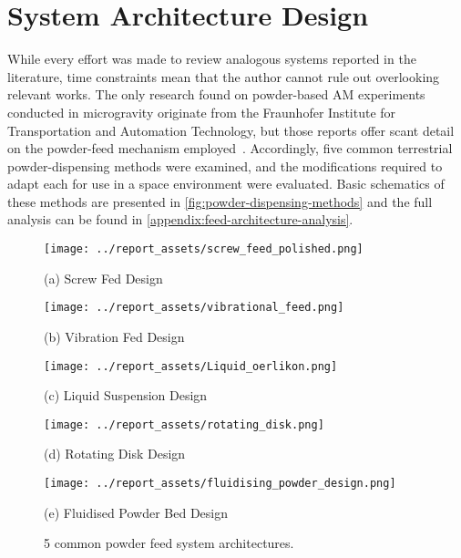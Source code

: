 \section{System Architecture Design}\label{sec:system_architecture}
While every effort was made to review analogous systems reported in the literature, time constraints mean that the author cannot rule out overlooking relevant works. The only research found on powder-based AM experiments conducted in microgravity originate from the Fraunhofer Institute for Transportation and Automation Technology, but those reports offer scant detail on the powder-feed mechanism employed~\cite{OVERMEYER2025}. Accordingly, five common terrestrial powder-dispensing methods were examined, and the modifications required to adapt each for use in a space environment were evaluated. Basic schematics of these methods are presented in \autoref{fig:powder-dispensing-methods} and the full analysis can be found in \autoref{appendix:feed-architecture-analysis}. 
\begin{figure}[htbp]
    \centering

    \begin{minipage}{0.3\textwidth}
        \centering
        \texttt{[image: ../report\_assets/screw\_feed\_polished.png]}
        \caption*{(a) Screw Fed Design~\cite{Bitragunta2015}}
    \end{minipage}
    \hfill
    \begin{minipage}{0.3\textwidth}
        \centering
        \texttt{[image: ../report\_assets/vibrational\_feed.png]}
        \caption*{(b) Vibration Fed Design~\cite{Sinclair2021}}
    \end{minipage}
    \hfill
    \begin{minipage}{0.3\textwidth}
        \centering
        \texttt{[image: ../report\_assets/Liquid\_oerlikon.png]}
        \caption*{(c) Liquid Suspension Design~\cite{OerlikonMetcoFeeders2023}}
    \end{minipage}

    \vspace{0.5cm} %

    \begin{minipage}{0.3\textwidth}
        \centering
        \texttt{[image: ../report\_assets/rotating\_disk.png]}
        \caption*{(d) Rotating Disk Design~\cite{Crawmer2013}}
    \end{minipage}
    \hspace{0.1\textwidth}
    \begin{minipage}{0.3\textwidth}
        \centering
        \texttt{[image: ../report\_assets/fluidising\_powder\_design.png]}
        \caption*{(e) Fluidised Powder Bed Design~\cite{Li2016}}
    \end{minipage}

    \caption{5 common powder feed system architectures.}\label{fig:powder-dispensing-methods}
\end{figure}
